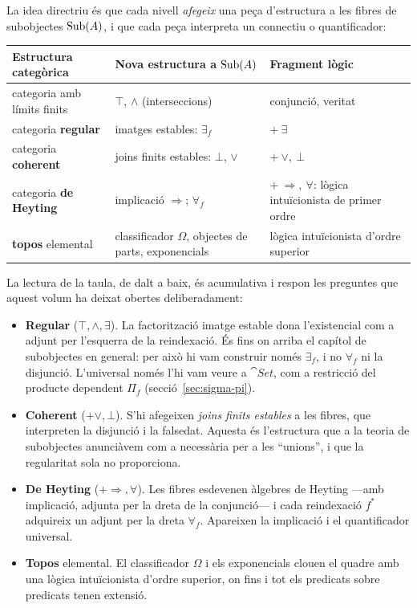 La idea directriu és que cada nivell \emph{afegeix} una peça d'estructura a les fibres de subobjectes $\operatorname{Sub}(A)$, i que cada peça interpreta un connectiu o quantificador:
\begin{center}
\renewcommand{\arraystretch}{1.3}
\noindent\begin{tabularx}{\linewidth}{@{}>{\raggedright\arraybackslash}X >{\raggedright\arraybackslash}X >{\raggedright\arraybackslash}X@{}}
\hline
\textbf{Estructura categòrica} & \textbf{Nova estructura a $\operatorname{Sub}(A)$} & \textbf{Fragment lògic}\\
\hline
categoria amb límits finits & $\top$, $\wedge$ (interseccions) & conjunció, veritat\\
categoria \textbf{regular} & imatges estables: $\exists_f$ & $+\ \exists$\\
categoria \textbf{coherent} & joins finits estables: $\bot$, $\vee$ & $+\ \vee,\ \bot$\\
categoria \textbf{de Heyting} & implicació $\Rightarrow$; $\forall_f$ & $+\ \Rightarrow,\ \forall$: lògica intuïcionista de primer ordre\\
\textbf{topos} elemental & classificador $\Omega$, objectes de parts, exponencials & lògica intuïcionista d'ordre superior\\
\hline
\end{tabularx}
\renewcommand{\arraystretch}{1.0}
\end{center}

La lectura de la taula, de dalt a baix, és acumulativa i respon les preguntes que aquest volum ha deixat obertes deliberadament:
\begin{itemize}
  \item \textbf{Regular} ($\top,\wedge,\exists$). La factorització imatge estable dona l'existencial com a adjunt per l'esquerra de la reindexació. És fins on arriba el capítol de subobjectes en general: per això hi vam construir només $\exists_f$, i no $\forall_f$ ni la disjunció. L'universal només l'hi vam veure a $\cat{Set}$, com a restricció del producte dependent $\Pi_f$ (secció~\ref{sec:sigma-pi}).
  \item \textbf{Coherent} ($+\vee,\bot$). S'hi afegeixen \emph{joins finits estables} a les fibres, que interpreten la disjunció i la falsedat. Aquesta és l'estructura que a la teoria de subobjectes anunciàvem com a necessària per a les \enquote{unions}, i que la regularitat sola no proporciona.
  \item \textbf{De Heyting} ($+\Rightarrow,\forall$). Les fibres esdevenen àlgebres de Heyting ---amb implicació, adjunta per la dreta de la conjunció--- i cada reindexació $f^{*}$ adquireix un adjunt per la dreta $\forall_f$. Apareixen la implicació i el quantificador universal.
  \item \textbf{Topos} elemental. El classificador $\Omega$ i els exponencials clouen el quadre amb una lògica intuïcionista d'ordre superior, on fins i tot els predicats sobre predicats tenen extensió.
\end{itemize}

